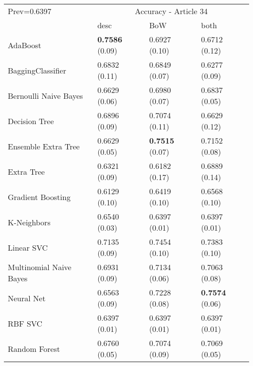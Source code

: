 \begin{tabular}{|l|l|l|l| }
\hline
Prev=0.6397 &  \multicolumn{3}{c|}{Accuracy - Article 34} \\
\cline{2-4} & desc & BoW & both \\ \hline
AdaBoost                & {\bf 0.7586} (0.09) & 0.6927 (0.10) & 0.6712 (0.12)\\
BaggingClassifier       & 0.6832 (0.11) & 0.6849 (0.07) & 0.6277 (0.09)\\
Bernoulli Naive Bayes   & 0.6629 (0.06) & 0.6980 (0.07) & 0.6837 (0.05)\\
Decision Tree           & 0.6896 (0.09) & 0.7074 (0.11) & 0.6629 (0.12)\\
Ensemble Extra Tree     & 0.6629 (0.05) & {\bf 0.7515} (0.07) & 0.7152 (0.08)\\
Extra Tree              & 0.6321 (0.09) & 0.6182 (0.17) & 0.6889 (0.14)\\
Gradient Boosting       & 0.6129 (0.10) & 0.6419 (0.10) & 0.6568 (0.10)\\
K-Neighbors             & 0.6540 (0.03) & 0.6397 (0.01) & 0.6397 (0.01)\\
Linear SVC              & 0.7135 (0.09) & 0.7454 (0.10) & 0.7383 (0.10)\\
Multinomial Naive Bayes & 0.6931 (0.09) & 0.7134 (0.06) & 0.7063 (0.08)\\
Neural Net              & 0.6563 (0.09) & 0.7228 (0.08) & {\bf 0.7574} (0.06)\\
RBF SVC                 & 0.6397 (0.01) & 0.6397 (0.01) & 0.6397 (0.01)\\
Random Forest           & 0.6760 (0.05) & 0.7074 (0.09) & 0.7069 (0.05)\\
\hline
\end{tabular}